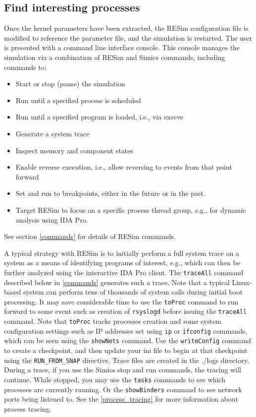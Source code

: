 \documentclass[titlepage]{article}
\begin{document}
\subsection{Find interesting processes}
Once the kernel parameters have been extracted, the RESim configuration file is modified to reference the parameter file, and the simulation is restarted. The user is
presented with a command line interface console.  This console manages the simulation via a combination of RESim and Simics commands, including commands to:
\begin{itemize}
\item Start or stop (pause) the simulation
\item Run until a specified process is scheduled
\item Run until a specified program is loaded, i.e., via execve
\item Generate a system trace
\item Inspect memory and component states
\item Enable reverse execution, i.e., allow reversing to events from that point forward
\item Set and run to breakpoints, either in the future or in the past.
\item Target RESim to focus on a specific process thread group, e.g., for dynamic analysis using IDA Pro.
\end{itemize}
\noindent See section \ref{commands} for details of RESim commands.

A typical strategy with RESim is to initially perform a full system trace on a system as a means of identifying programs of interest, e.g., which can then be
further analyzed using the interactive IDA Pro client.  The {\tt traceAll} command described below in \ref{commands} generates such a trace.  Note that a typical Linux-based
system can perform tens of thousands of system calls during initial boot processing.  It may save considerable time to use the {\tt toProc} command to run forward to some
event such as creation of {\tt rsyslogd} before issuing the {\tt traceAll} command.  Note that {\tt toProc} tracks processes creation and some system configuration settings such as
IP addresses set using {\tt ip} or {\tt ifconfig} commands, which can be seen using the {\tt showNets} command.  Use the {\tt writeConfig} command to create a checkpoint,
and then update your ini file to begin at that checkpoint using the {\tt RUN\_FROM\_SNAP} directive.  Trace files are created in the ./logs directory.  During a trace, if you use the Simics stop and
run commands, the tracing will continue.  While stopped, you may use the {\tt tasks} commands to see which processes are currently running.  Or the {\tt showBinders} command to 
see network ports being listened to. See the \ref{process_tracing} for more information about process tracing. 
\end{document}
